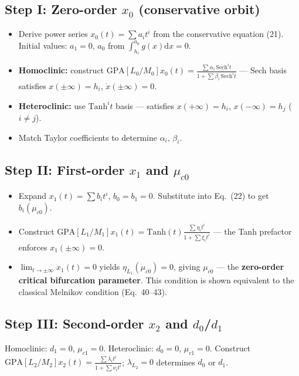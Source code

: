 \documentclass[11pt,a4paper]{article}
\begin{document}
\subsection{Step I: Zero-order $x_0$ (conservative orbit)}

\begin{itemize}[leftmargin=2em]
\item Derive power series $x_0(t)=\sum a_i t^i$ from the conservative equation (21). Initial values: $a_1=0$, $a_0$ from $\int_{h_i}^{a_0}g(x)\mathrm{d}x=0$.
\item \textbf{Homoclinic:} construct $\text{GPA}[L_0/M_0]x_0(t)=\frac{\sum\alpha_i\,\text{Sech}^i t}{1+\sum\beta_i\,\text{Sech}^i t}$ --- Sech basis satisfies $x(\pm\infty)=h_i$, $\dot{x}(\pm\infty)=0$.
\item \textbf{Heteroclinic:} use $\text{Tanh}^i t$ basis --- satisfies $x(+\infty)=h_i$, $x(-\infty)=h_j$ ($i\neq j$).
\item Match Taylor coefficients to determine $\alpha_i$, $\beta_i$.
\end{itemize}

\subsection{Step II: First-order $x_1$ and $\mu_{c0}$}

\begin{itemize}[leftmargin=2em]
\item Expand $x_1(t)=\sum b_i t^i$, $b_0=b_1=0$. Substitute into Eq.\ (22) to get $b_i(\mu_{c0})$.
\item Construct $\text{GPA}[L_1/M_1]x_1(t)=\text{Tanh}(t)\frac{\sum\eta_i t^i}{1+\sum\xi_i t^i}$ --- the Tanh prefactor enforces $x_1(\pm\infty)=0$.
\item $\lim_{t\to\pm\infty}x_1(t)=0$ yields $\eta_{L_1}(\mu_{c0})=0$, giving $\mu_{c0}$ --- the \textbf{zero-order critical bifurcation parameter}. This condition is shown equivalent to the classical Melnikov condition (Eq.\ 40--43).
\end{itemize}

\subsection{Step III: Second-order $x_2$ and $d_0$/$d_1$}

Homoclinic: $d_1=0$, $\mu_{c1}=0$. Heteroclinic: $d_0=0$, $\mu_{c1}=0$. Construct $\text{GPA}[L_2/M_2]x_2(t)=\frac{\sum\lambda_i t^i}{1+\sum\nu_i t^i}$; $\lambda_{L_2}=0$ determines $d_0$ or $d_1$.
\end{document}
